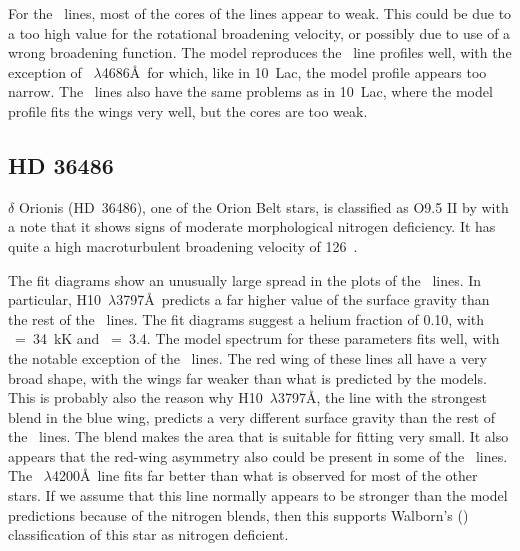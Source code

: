 For the \hei\ lines, most of the cores of the lines appear to
weak. This could be due to a too high value for the rotational
broadening velocity, or possibly due to use of a wrong broadening
function. The model reproduces the \heii\ line profiles well, with the
exception of \heii~$\lambda$4686\AA\ for which, like in 10~Lac, the
model profile appears too narrow. The \hi\ lines also have the same
problems as in 10~Lac, where the model profile fits the wings very
well, but the cores are too weak.


\subsection{HD 36486}  %
\label{analysis:hd036486}
$\delta$ Orionis (HD~36486), one of the Orion Belt stars, is
classified as O9.5 II by  with a note that it shows
signs of moderate morphological nitrogen deficiency. It has quite a
high macroturbulent broadening velocity of 126~\kms.

The fit diagrams show an unusually large spread in the plots of the
\hi\ lines. In particular, H10~$\lambda$3797\AA\ predicts a far higher
value of the surface gravity than the rest of the \hi\ lines. The fit
diagrams suggest a helium fraction of 0.10, with \teff~=~34~kK and
\logg~=~3.4. The model spectrum for these parameters fits well, with
the notable exception of the \hi\ lines. The red wing of these lines
all have a very broad shape, with the wings far weaker than what is
predicted by the models. This is probably also the reason why
H10~$\lambda$3797\AA, the line with the strongest blend in the blue
wing, predicts a very different surface gravity than the rest of the
\hi\ lines. The blend makes the area that is suitable for fitting very
small. It also appears that the red-wing asymmetry also could be
present in some of the \hei\ lines. The \heii~$\lambda$4200\AA\ line
fits far better than what is observed for most of the other stars. If
we assume that this line normally appears to be stronger than the
model predictions because of the nitrogen blends, then this supports
Walborn's (\citeyear{wa:76}) classification of this star as nitrogen
deficient.


